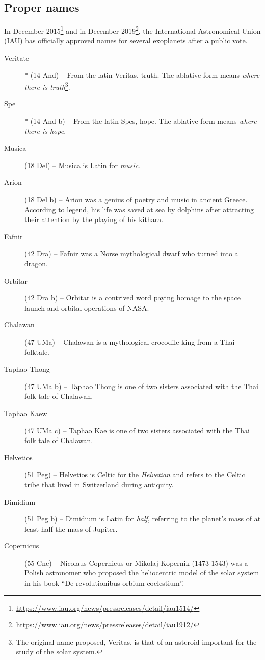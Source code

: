 \subsection{Proper names}
\label{sec:plugins:Exoplanets:ProperNames}
In December 2015\footnote{%
  \url{https://www.iau.org/news/pressreleases/detail/iau1514/}} and in December 2019\footnote{%
      \url{https://www.iau.org/news/pressreleases/detail/iau1912/}}, the International Astronomical Union (IAU) has officially approved names for several exoplanets after a public vote.
\begin{description}
\item[Veritate]* (14 And) -- From the latin Veritas, truth. The ablative form means \textit{where there is truth}\footnote{The original name proposed, Veritas, is that of an asteroid important for the study of the solar system.}.
\item[Spe]* (14 And b) -- From the latin Spes, hope. The ablative form means \textit{where there is hope}.
\item[Musica] (18 Del) -- Musica is Latin for \textit{music}.
\item[Arion] (18 Del b) -- Arion was a genius of poetry and music in ancient Greece. According to legend, his life was saved at sea by dolphins after attracting their attention by the playing of his kithara.
\item[Fafnir] (42 Dra) -- Fafnir was a Norse mythological dwarf who turned into a dragon.
\item[Orbitar] (42 Dra b) -- Orbitar is a contrived word paying homage to the space launch and orbital operations of NASA.
\item[Chalawan] (47 UMa) -- Chalawan is a mythological crocodile king from a Thai folktale.
\item[Taphao Thong] (47 UMa b) -- Taphao Thong is one of two sisters associated with the Thai folk tale of Chalawan.
\item[Taphao Kaew] (47 UMa c) -- Taphao Kae is one of two sisters associated with the Thai folk tale of Chalawan.
\item[Helvetios] (51 Peg) -- Helvetios is Celtic for the \textit{Helvetian} and refers to the Celtic tribe that lived in Switzerland during antiquity.
\item[Dimidium] (51 Peg b) -- Dimidium is Latin for \textit{half}, referring to the planet's mass of at least half the mass of Jupiter.
\item[Copernicus] (55 Cnc) -- Nicolaus Copernicus or Mikolaj Kopernik (1473-1543) was a Polish astronomer who proposed the heliocentric model of the solar system in his book ``De revolutionibus orbium coelestium''.

\end{description}
